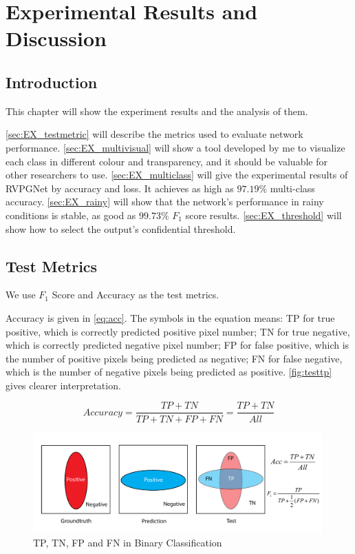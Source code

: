 
\chapter{Experimental Results and Discussion}
\label{cha:experiments}
\begin{spacing}{1.5}
\setlength{\parskip}{0.3in}

\section{Introduction}

This chapter will show the experiment results and the analysis of them.

\autoref{sec:EX_testmetric} will describe the metrics used to evaluate network performance. \autoref{sec:EX_multivisual} will show a tool developed by me to visualize each class in different colour and transparency, and it should be valuable for other researchers to use. \autoref{sec:EX_multiclass} will give the experimental results of RVPGNet by accuracy and loss. It achieves as high as $97.19\%$ multi-class accuracy. \autoref{sec:EX_rainy} will show that the network's performance in rainy conditions is stable, as good as $99.73\%$ $F_1$ score results. \autoref{sec:EX_threshold} will show how to select the output's confidential threshold.

\section{Test Metrics}
\label{sec:EX_testmetric}

We use $F_1$ Score and Accuracy as the test metrics.

Accuracy is given in \autoref{eq:acc}. The symbols in the equation means: TP for true positive, which is correctly predicted positive pixel number; TN for true negative, which is correctly predicted negative pixel number; FP for false positive, which is the number of positive pixels being predicted as negative; FN for false negative, which is the number of negative pixels being predicted as positive. \autoref{fig:testtp} gives clearer interpretation.

\begin{equation}
\label{eq:acc}
    Accuracy=\frac{TP+TN}{TP+TN+FP+FN}=\frac{TP+TN}{All}
\end{equation}

\begin{figure}[ht]
\centering
\includegraphics[width=0.99\textwidth, fbox]{Chapter5/testtp.pdf}
\caption{TP, TN, FP and FN in Binary Classification}
\label{fig:testtp} 
\end{figure}


\end{spacing}
